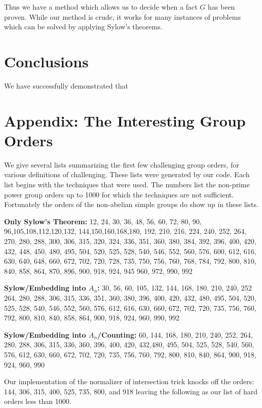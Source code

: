 \documentclass[11pt, oneside]{article}   	%
\begin{document}
Thus we have a method which allows us to decide when a fact $G$ has been proven.  While our method is crude, it works for many instances of problems which can be solved by applying Sylow's theorems.

\section{Conclusions}
We have successfully demonstrated that 

\section{Appendix: The Interesting Group Orders}
We give several lists summarizing the first few challenging group orders, for various definitions of challenging.  These lists were generated by our code.  Each list begins with the techniques that were used. The numbers list the non-prime power group orders up to 1000 for which the techniques are not sufficient. Fortunately the orders of the non-abelian simple groups do show up in these lists.
\newline

\textbf{Only Sylow's Theorem:} 12, 24, 30, 36, 48, 56, 60, 72,
80, 90, 96,105,108,112,120,132,
144,150,160,168,180, 192, 210, 216,
224, 240, 252, 264, 270, 280, 288, 300,
306, 315, 320, 324, 336, 351, 360, 380,
384, 392, 396, 400, 420, 432, 448, 450, 480, 495, 504, 520, 525, 528,
540, 546, 552, 560, 576, 600, 612, 616, 630,
640, 648, 660, 672, 702, 720, 728, 735, 750, 756, 760, 768,
784, 792, 800, 810, 840, 858, 864, 870, 896, 900, 918, 924, 945
960, 972, 990, 992
\newline

\textbf{Sylow/Embedding into $A_n$:}
30, 56, 60, 105, 132, 144, 168, 180, 210, 240, 252 264, 280, 288, 306, 315, 336, 351, 360, 380, 396,
400, 420, 432, 480, 495, 504, 520, 525, 528, 540, 546,
552, 560, 576, 612, 616, 630, 660, 672,
702, 720, 735, 756, 760, 792, 800, 810, 840, 858, 864, 900, 918, 924, 960, 990, 992
\newline

\textbf{Sylow/Embedding into $A_n$/Counting:} 60,
144, 168, 180, 210, 240, 252, 264, 280, 288, 306, 315, 336, 360, 396,
400, 420, 432,480, 495, 504, 525, 528, 540, 560, 576,
612, 630, 660, 672, 702, 720, 735, 756, 760, 792, 800, 810,
840, 864, 900, 918, 924, 960, 990
\newline

Our implementation of the normalizer of intersection trick knocks off the orders: 144, 306, 315, 400, 525, 735, 800, and 918 leaving the following as our list of hard orders less than 1000.
\newline
\end{document}
